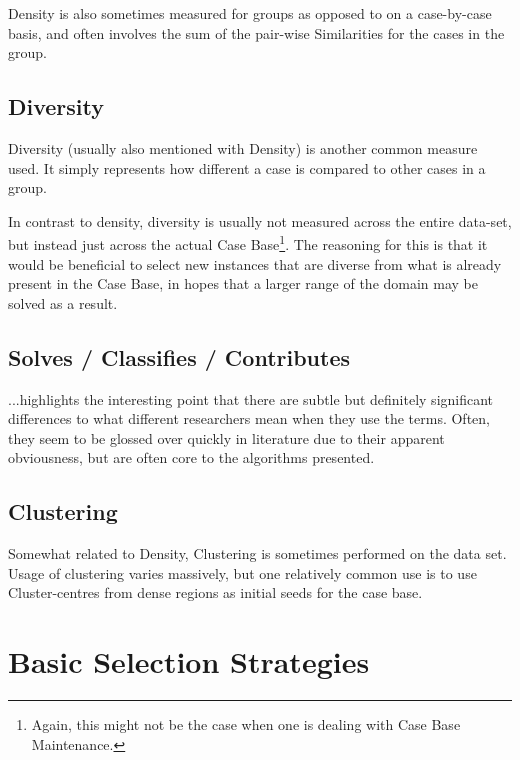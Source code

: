 \documentclass[a4paper,11pt]{report}
\begin{document}
Density is also sometimes measured for groups as opposed to on a case-by-case basis\cite{Smyth1998}, and often involves the sum of the pair-wise Similarities for the cases in the group.

\subsection{Diversity}

Diversity (usually also mentioned with Density) is another common measure used. It simply represents how different a case is compared to other cases in a group.

In contrast to density, diversity is usually not measured across the entire data-set, but instead just across the actual Case Base\footnote{Again, this might not be the case when one is dealing with Case Base Maintenance.}. The reasoning for this is that it would be beneficial to select new instances that are diverse from what is already present in the Case Base, in hopes that a larger range of the domain may be solved as a result. 

\subsection{Solves / Classifies / Contributes}

...highlights the interesting point that there are subtle but definitely significant differences to what different researchers mean when they use the terms. Often, they seem to be glossed over quickly in literature due to their apparent obviousness, but are often core to the algorithms presented.


\subsection{Clustering}
Somewhat related to Density, Clustering is sometimes performed on the data set. Usage of clustering varies massively, but one relatively common use is to use Cluster-centres from dense regions as initial seeds for the case base.


\section{Basic Selection Strategies}
\end{document}
